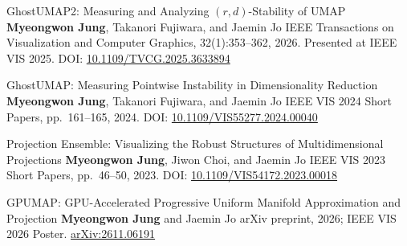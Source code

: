 \begin{cventries}
  \cventrysingle
    {GhostUMAP2: Measuring and Analyzing $(r,d)$-Stability of UMAP}
    {\textbf{Myeongwon Jung}, Takanori Fujiwara, and Jaemin Jo}
    {IEEE Transactions on Visualization and Computer Graphics, 32(1):353–362, 2026. Presented at IEEE VIS 2025.\newline
     DOI: \href{https://doi.org/10.1109/TVCG.2025.3633894}{10.1109/TVCG.2025.3633894}}

  \cventrysingle
    {GhostUMAP: Measuring Pointwise Instability in Dimensionality Reduction}
    {\textbf{Myeongwon Jung}, Takanori Fujiwara, and Jaemin Jo}
    {IEEE VIS 2024 Short Papers, pp.\ 161–165, 2024.\newline
     DOI: \href{https://doi.org/10.1109/VIS55277.2024.00040}{10.1109/VIS55277.2024.00040}}

  \cventrysingle
    {Projection Ensemble: Visualizing the Robust Structures of Multidimensional Projections}
    {\textbf{Myeongwon Jung}, Jiwon Choi, and Jaemin Jo}
    {IEEE VIS 2023 Short Papers, pp.\ 46–50, 2023.\newline
     DOI: \href{https://doi.org/10.1109/VIS54172.2023.00018}{10.1109/VIS54172.2023.00018}}

  \cventrysingle
    {GPUMAP: GPU-Accelerated Progressive Uniform Manifold Approximation and Projection}
    {\textbf{Myeongwon Jung} and Jaemin Jo}
    {arXiv preprint, 2026; IEEE VIS 2026 Poster.\newline
     \href{https://arxiv.org/abs/2611.06191}{arXiv:2611.06191}}
\end{cventries}
